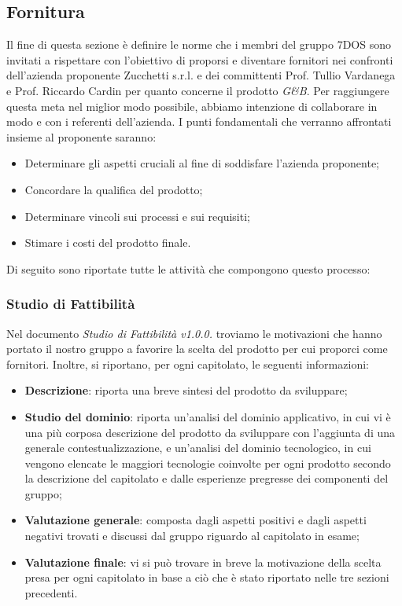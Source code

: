 \subsection{Fornitura}
Il fine di questa sezione è definire le norme che i membri del gruppo 7DOS sono invitati a rispettare con l'obiettivo di proporsi e diventare fornitori nei confronti dell'azienda proponente Zucchetti s.r.l. e dei committenti Prof. Tullio Vardanega e Prof. Riccardo Cardin per quanto concerne il prodotto \emph{G\&B}.
Per raggiungere questa meta nel miglior modo possibile, abbiamo intenzione di collaborare in modo  e  con i referenti dell'azienda.
I punti fondamentali che verranno affrontati insieme al proponente saranno:
\begin{itemize}
\item Determinare gli aspetti cruciali al fine di soddisfare l'azienda proponente;
\item Concordare la qualifica del prodotto;
\item Determinare vincoli sui processi e sui requisiti;
\item Stimare i costi del prodotto finale.
\end{itemize}
Di seguito sono riportate tutte le attività che compongono questo processo:
\subsubsection{Studio di Fattibilità}
Nel documento \emph{Studio di Fattibilità v1.0.0.} troviamo le motivazioni che hanno portato il nostro gruppo a favorire la scelta del prodotto per cui proporci come fornitori. Inoltre, si riportano, per ogni capitolato, le seguenti informazioni:
\begin{itemize}
 	\item\textbf{{Descrizione}}: riporta una breve sintesi del prodotto da sviluppare;
 	\item\textbf{{Studio del dominio}}: riporta un'analisi del dominio applicativo, in cui vi è una più corposa descrizione del prodotto da sviluppare con l'aggiunta di una generale contestualizzazione, e un'analisi del dominio tecnologico, in cui vengono elencate le maggiori tecnologie coinvolte per ogni prodotto secondo la descrizione del capitolato e dalle esperienze pregresse dei componenti del gruppo;
 	\item\textbf{{Valutazione generale}}: composta dagli aspetti positivi e dagli aspetti negativi trovati e discussi dal gruppo riguardo al capitolato in esame;
 	\item\textbf{{Valutazione finale}}: vi si può trovare in breve la motivazione della scelta presa per ogni capitolato in base a ciò che è stato riportato nelle tre sezioni precedenti.
\end{itemize}
\pagebreak
